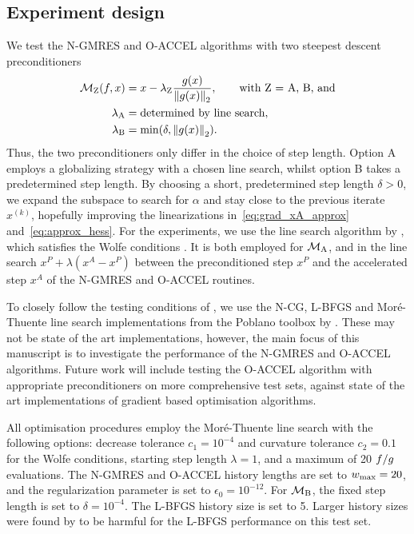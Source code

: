 \documentclass[main.tex]{subfiles}
\begin{document}
\subsection{Experiment design}\label{subsec:experiment_design}
We test the N-GMRES and O-ACCEL algorithms with two steepest descent
preconditioners
\begin{align}
  \mathcal{M}_{\text{Z}}(f,x) &= x-\lambda_{\text{Z}} \frac{g(x)}{\left\lVert g(x)\right\rVert_2}, \qquad
                               \text{with Z = A, B, and}\nonumber\\
  \lambda_{\text{A}} &= \text{determined by line search},\\
  \lambda_{\text{B}} &= \min(\delta,\left\lVert g(x)\right\rVert_2).
\end{align}
Thus, the two preconditioners only differ in the choice of step
length. Option A employs a globalizing strategy with a chosen line
search, whilst option B takes a predetermined step length.  By
choosing a short, predetermined step length $\delta>0$, we expand the
subspace to search for $\alpha$ and stay close to the previous iterate
$x^{(k)}$, hopefully improving the linearizations
in~\eqref{eq:grad_xA_approx} and~\eqref{eq:approx_hess}.  For the
experiments, we use the line search algorithm by \citet{more1994line},
which satisfies the Wolfe conditions \citep{nocedal2006numerical}.  It
is both employed for $\mathcal{M}_{\text{A}}$, and in the line search
$x^P+\lambda(x^A-x^P)$ between the preconditioned step $x^P$ and the
accelerated step $x^A$ of the N-GMRES and O-ACCEL routines.

To closely follow the testing conditions of
\citet{sterck2013steepest}, we use the N-CG, L-BFGS and
Mor\'{e}-Thuente line search implementations from the Poblano toolbox
by \citet{dunlavy2010poblano}.  These may not be state of the art
implementations, however, the main focus of this manuscript is to
investigate the performance of the N-GMRES and O-ACCEL
algorithms. Future work will include testing the O-ACCEL algorithm
with appropriate preconditioners on more comprehensive test sets,
against state of the art implementations of gradient based
optimisation algorithms.

All optimisation procedures employ the Mor\'{e}-Thuente line search
with the following options: decrease tolerance $c_1=10^{-4}$ and
curvature tolerance $c_2=0.1$ for the Wolfe conditions, starting step
length $\lambda=1$, and a maximum of \num{20} $f/g$
evaluations.  The N-GMRES and O-ACCEL history lengths are set to
$w_{\textnormal{max}}=20$, and the regularization parameter is set to
$\epsilon_0=10^{-12}$.  For $\mathcal{M}_{\text{B}}$, the fixed step
length is set to $\delta=10^{-4}$.  The L-BFGS history size is set to
\num{5}. Larger history sizes were found by \citet{sterck2013steepest}
to be harmful for the L-BFGS performance on this test set.
\end{document}
